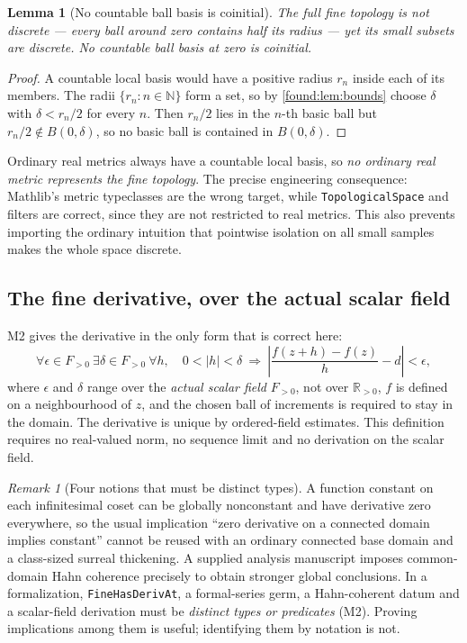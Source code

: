 \documentclass[11pt,letterpaper]{article}
\numberwithin{equation}{section}
\newtheorem{lemma}[theorem]{Lemma}
\theoremstyle{definition}
\theoremstyle{remark}
\newtheorem{remark}[theorem]{Remark}
\newcommand{\R}{\mathbb R}
\newcommand{\N}{\mathbb N}
\begin{document}
\begin{lemma}[No countable ball basis is coinitial]\label{found:lem:nometric}
The full fine topology is not discrete --- every ball around zero contains half
its radius --- yet its small subsets are discrete. No countable ball basis at
zero is coinitial.
\end{lemma}
\begin{proof}
A countable local basis would have a positive radius $r_n$ inside each of its
members. The radii $\{r_n:n\in\N\}$ form a set, so by \cref{found:lem:bounds}
choose $\delta$ with $\delta<r_n/2$ for every $n$. Then $r_n/2$ lies in the
$n$-th basic ball but $r_n/2\notin B(0,\delta)$, so no basic ball is contained
in $B(0,\delta)$.
\end{proof}

Ordinary real metrics always have a countable local basis, so \emph{no ordinary
real metric represents the fine topology}. The precise engineering consequence:
Mathlib's metric typeclasses are the wrong target, while
\texttt{TopologicalSpace} and filters are correct, since they are not restricted
to real metrics. This also prevents importing the ordinary intuition that
pointwise isolation on all small samples makes the whole space discrete.

\subsection{The fine derivative, over the actual scalar field}
\label{found:sub:derivative}
M2 gives the derivative in the only form that is correct here:
\begin{equation}\label{found:eq:derivative}
 \forall\epsilon\in F_{>0}\ \exists\delta\in F_{>0}\ \forall h,\quad
 0<|h|<\delta\ \Longrightarrow\
 \left|\frac{f(z+h)-f(z)}{h}-d\right|<\epsilon,
\end{equation}
where $\epsilon$ and $\delta$ range over the \emph{actual scalar field}
$F_{>0}$, not over $\R_{>0}$, $f$ is defined on a neighbourhood of $z$, and the
chosen ball of increments is required to stay in the domain. The derivative is
unique by ordered-field estimates. This definition requires no real-valued norm,
no sequence limit and no derivation on the scalar field.

\begin{remark}[Four notions that must be distinct types]\label{found:rem:fourtypes}
A function constant on each infinitesimal coset can be globally nonconstant and
have derivative zero everywhere, so the usual implication ``zero derivative on a
connected domain implies constant'' cannot be reused with an ordinary connected
base domain and a class-sized surreal thickening. A supplied analysis
manuscript imposes common-domain Hahn coherence precisely to obtain stronger
global conclusions. In a formalization, \texttt{FineHasDerivAt}, a formal-series
germ, a Hahn-coherent datum and a scalar-field derivation must be \emph{distinct
types or predicates} (M2). Proving implications among them is useful;
identifying them by notation is not.
\end{remark}
\end{document}

